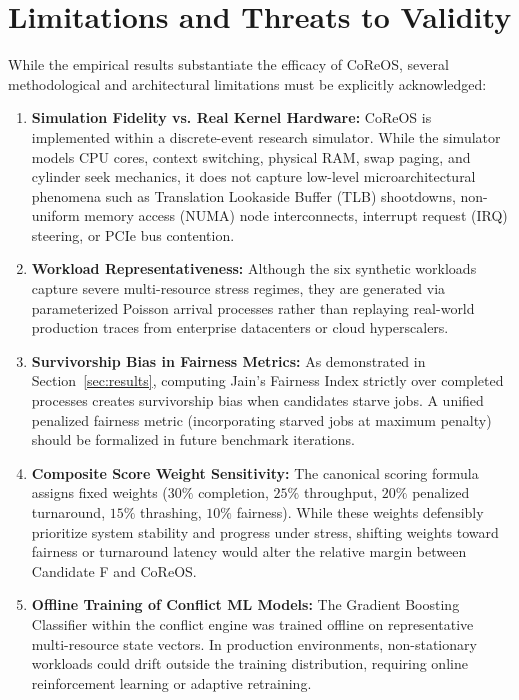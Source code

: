 \documentclass[conference]{IEEEtran}
\begin{document}
\section{Limitations and Threats to Validity}
\label{sec:limitations}
While the empirical results substantiate the efficacy of CoReOS, several methodological and architectural limitations must be explicitly acknowledged:
\begin{enumerate}
    \item \textbf{Simulation Fidelity vs. Real Kernel Hardware:} CoReOS is implemented within a discrete-event research simulator. While the simulator models CPU cores, context switching, physical RAM, swap paging, and cylinder seek mechanics, it does not capture low-level microarchitectural phenomena such as Translation Lookaside Buffer (TLB) shootdowns, non-uniform memory access (NUMA) node interconnects, interrupt request (IRQ) steering, or PCIe bus contention.
    \item \textbf{Workload Representativeness:} Although the six synthetic workloads capture severe multi-resource stress regimes, they are generated via parameterized Poisson arrival processes rather than replaying real-world production traces from enterprise datacenters or cloud hyperscalers.
    \item \textbf{Survivorship Bias in Fairness Metrics:} As demonstrated in Section~\ref{sec:results}, computing Jain's Fairness Index strictly over completed processes creates survivorship bias when candidates starve jobs. A unified penalized fairness metric (incorporating starved jobs at maximum penalty) should be formalized in future benchmark iterations.
    \item \textbf{Composite Score Weight Sensitivity:} The canonical scoring formula assigns fixed weights ($30\%$ completion, $25\%$ throughput, $20\%$ penalized turnaround, $15\%$ thrashing, $10\%$ fairness). While these weights defensibly prioritize system stability and progress under stress, shifting weights toward fairness or turnaround latency would alter the relative margin between Candidate F and CoReOS.
    \item \textbf{Offline Training of Conflict ML Models:} The Gradient Boosting Classifier within the conflict engine was trained offline on representative multi-resource state vectors. In production environments, non-stationary workloads could drift outside the training distribution, requiring online reinforcement learning or adaptive retraining.
\end{enumerate}
\end{document}
